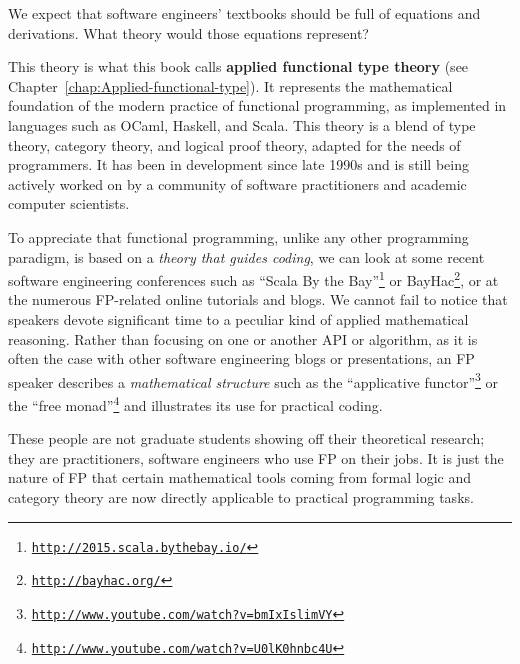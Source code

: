 We expect that software engineers\textsf{'} textbooks should be full
of equations and derivations. What theory would those equations represent?

This theory is what this book calls \textbf{applied functional type
theory} (see Chapter~\ref{chap:Applied-functional-type}).
It represents the mathematical foundation of the modern practice of
functional programming, as implemented in languages such as OCaml,
Haskell, and Scala. This theory is a blend of type theory, category
theory, and logical proof theory, adapted for the needs of programmers.
It has been in development since late 1990s and is still being actively
worked on by a community of software practitioners and academic computer
scientists.

To appreciate that functional programming, unlike any other programming
paradigm, is based on a \emph{theory that guides coding}, we can look
at some recent software engineering conferences such as \textsf{``}Scala By
the Bay\textsf{''}\footnote{\texttt{\href{http://2015.scala.bythebay.io/}{http://2015.scala.bythebay.io/}}}
or BayHac\footnote{\texttt{\href{http://bayhac.org/}{http://bayhac.org/}}},
or at the numerous FP-related online tutorials and blogs. We cannot
fail to notice that speakers devote significant time to a peculiar
kind of applied mathematical reasoning. Rather than focusing on one
or another API or algorithm, as it is often the case with other software
engineering blogs or presentations, an FP speaker describes a \emph{mathematical
structure} \textemdash{} such as the \textsf{``}applicative functor\textsf{''}\footnote{\texttt{\href{http://www.youtube.com/watch?v=bmIxIslimVY}{http://www.youtube.com/watch?v=bmIxIslimVY}}}
or the \textsf{``}free monad\textsf{''}\footnote{\texttt{\href{http://www.youtube.com/watch?v=U0lK0hnbc4U}{http://www.youtube.com/watch?v=U0lK0hnbc4U}}}
\textemdash{} and illustrates its use for practical coding.

These people are not graduate students showing off their theoretical
research; they are practitioners, software engineers who use FP on
their jobs. It is just the nature of FP that certain mathematical
tools \textemdash{} coming from formal logic and category theory \textemdash{}
are now directly applicable to practical programming tasks.

